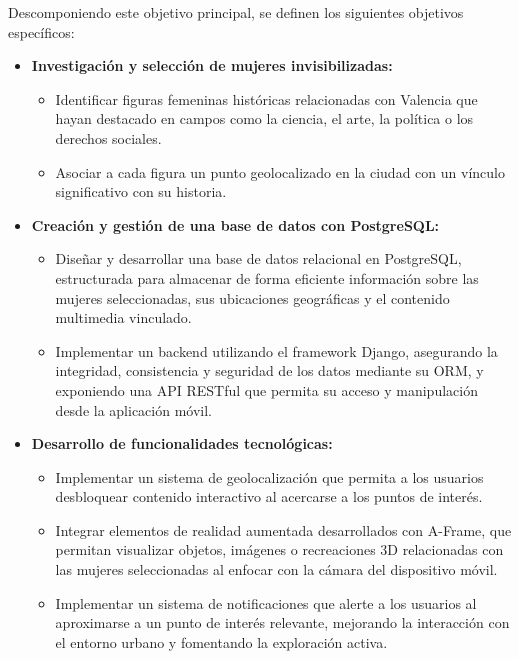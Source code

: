 Descomponiendo este objetivo principal, se definen los siguientes objetivos específicos:

\begin{itemize}
    \item \textbf{Investigación y selección de mujeres invisibilizadas:}
    \begin{itemize}
        \item Identificar figuras femeninas históricas relacionadas con Valencia que hayan destacado en campos como la ciencia, el arte, la política o los derechos sociales.
        \item Asociar a cada figura un punto geolocalizado en la ciudad con un vínculo significativo con su historia.
    \end{itemize}

    \item \textbf{Creación y gestión de una base de datos con PostgreSQL:}
    \begin{itemize}
        \item Diseñar y desarrollar una base de datos relacional en PostgreSQL, estructurada para almacenar de forma eficiente información sobre las mujeres seleccionadas, sus ubicaciones geográficas y el contenido multimedia vinculado.
        \item Implementar un backend utilizando el framework Django, asegurando la integridad, consistencia y seguridad de los datos mediante su ORM, y exponiendo una API RESTful que permita su acceso y manipulación desde la aplicación móvil.
    \end{itemize}


    \item \textbf{Desarrollo de funcionalidades tecnológicas:}
    \begin{itemize}
        \item Implementar un sistema de geolocalización que permita a los usuarios desbloquear contenido interactivo al acercarse a los puntos de interés.
        \item Integrar elementos de realidad aumentada desarrollados con A-Frame, que permitan visualizar objetos, imágenes o recreaciones 3D relacionadas con las mujeres seleccionadas al enfocar con la cámara del dispositivo móvil.
        \item Implementar un sistema de notificaciones que alerte a los usuarios al aproximarse a un punto de interés relevante, mejorando la interacción con el entorno urbano y fomentando la exploración activa.
    \end{itemize}


\end{itemize}
